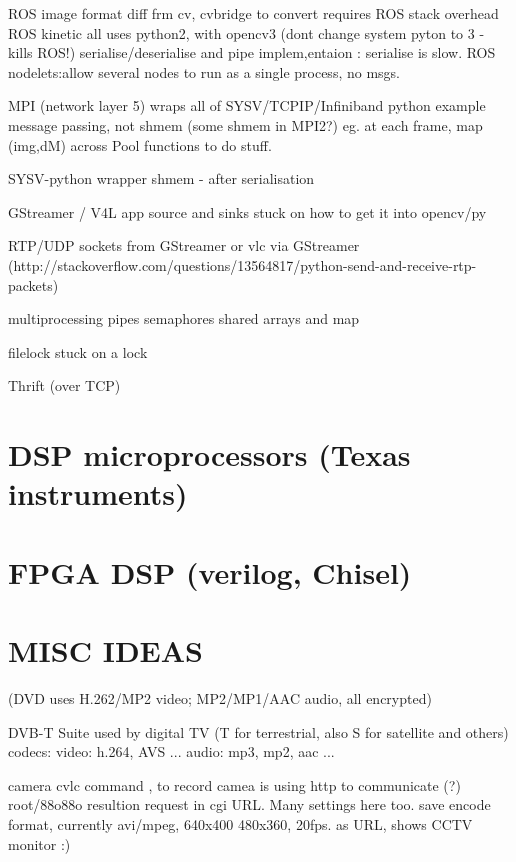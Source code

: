 \documentclass[oneside,english]{scrbook}
\begin{document}
ROS image format diff frm cv, cvbridge to convert requires ROS stack
overhead ROS kinetic all uses python2, with opencv3 (dont change system
pyton to 3 - kills ROS!) serialise/deserialise and pipe implem,entaion
: serialise is slow. ROS nodelets:allow several nodes to run as a
single process, no msgs.

MPI (network layer 5) wraps all of SYSV/TCPIP/Infiniband python example
message passing, not shmem (some shmem in MPI2?) eg. at each frame,
map (img,dM) across Pool functions to do stuff.

SYSV-python wrapper shmem - after serialisation

GStreamer / V4L app source and sinks stuck on how to get it into opencv/py

RTP/UDP sockets from GStreamer or vlc via GStreamer (http://stackoverflow.com/questions/13564817/python-send-and-receive-rtp-packets)

multiprocessing pipes semaphores shared arrays and map

filelock stuck on a lock

Thrift (over TCP)


\chapter{DSP microprocessors (Texas instruments)}

\chapter{FPGA DSP (verilog, Chisel)}

\chapter{MISC IDEAS}



(DVD uses H.262/MP2 video;  MP2/MP1/AAC audio, all encrypted)

DVB-T Suite used by digital TV (T for terrestrial, also S for satellite and others)
	codecs:
		video: h.264, AVS ...
		audio: mp3, mp2, aac ...


camera cvlc command , to record
	camea is using http to communicate (?) root/88o88o
	resultion request in cgi URL.  Many settings here too.
	save encode format, currently avi/mpeg, 640x400
	480x360, 20fps.
	as URL, shows CCTV monitor :)
\end{document}
